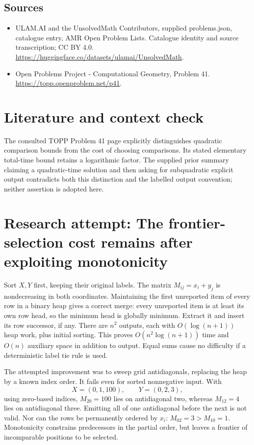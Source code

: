 \documentclass[11pt,a4paper]{article}
\begin{document}
\subsection{Sources}
\begin{itemize}
\item[S1] ULAM.AI and the UnsolvedMath Contributors, supplied problems.json, catalogue entry, AMR Open Problem Lists. Catalogue identity and source transcription; CC BY 4.0.
\url{https://huggingface.co/datasets/ulamai/UnsolvedMath}.
\item[S2] Open Problems Project - Computational Geometry, Problem 41. 
\url{https://topp.openproblem.net/p41}.
\end{itemize}

\section{Literature and context check}
The consulted TOPP Problem 41 page explicitly distinguishes quadratic
comparison bounds from the cost of choosing comparisons. Its stated elementary
total-time bound retains a logarithmic factor. The supplied prior summary
claiming a quadratic-time solution and then asking for subquadratic explicit
output contradicts both this distinction and the labelled output convention;
neither assertion is adopted here.
\section{Research attempt: The frontier-selection cost remains after exploiting monotonicity}
Sort $X,Y$ first, keeping their original labels. The matrix
$M_{ij}=x_i+y_j$ is nondecreasing in both coordinates. Maintaining the first
unreported item of every row in a binary heap gives a correct merge: every
unreported item is at least its own row head, so the minimum head is globally
minimum. Extract it and insert its row successor, if any. There are $n^2$
outputs, each with $O(\log(n+1))$ heap work, plus initial sorting. This proves
$O(n^2\log(n+1))$ time and $O(n)$ auxiliary space in addition to output.
Equal sums cause no difficulty if a deterministic label tie rule is used.

The attempted improvement was to sweep grid antidiagonals, replacing the heap
by a known index order. It fails even for sorted nonnegative input. With
\[
 X=(0,1,100),\qquad Y=(0,2,3),
\]
using zero-based indices, $M_{20}=100$ lies on antidiagonal two, whereas
$M_{12}=4$ lies on antidiagonal three. Emitting all of one antidiagonal before
the next is not valid. Nor can the rows be permanently ordered by $x_i$:
$M_{02}=3>M_{10}=1$. Monotonicity constrains predecessors in the partial order,
but leaves a frontier of incomparable positions to be selected.
\end{document}
